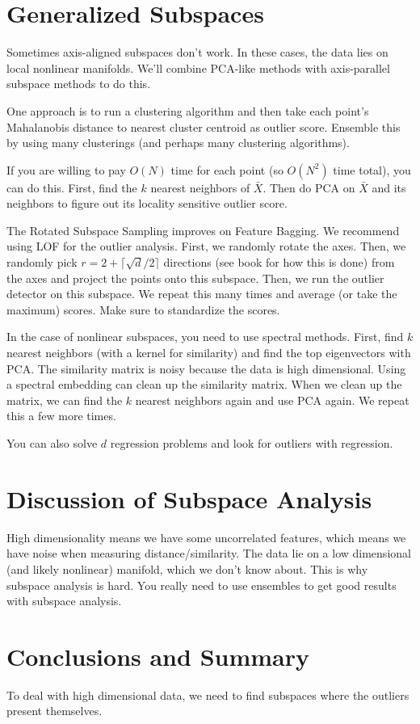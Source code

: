 \documentclass[a4paper]{article}
\begin{document}
\section{Generalized Subspaces}
Sometimes axis-aligned subspaces don't work. In these cases, the data lies on
local nonlinear manifolds. We'll combine PCA-like methods with axis-parallel
subspace methods to do this.

One approach is to run a clustering algorithm and then take each point's
Mahalanobis distance to nearest cluster centroid as outlier score. Ensemble this
by using many clusterings (and perhaps many clustering algorithms).

If you are willing to pay $O(N)$ time for each point (so $O(N^2)$ time total),
you can do this. First, find the $k$ nearest neighbors of $\bar{X}$. Then
do PCA on $\bar{X}$ and its neighbors to figure out its locality sensitive
outlier score.

The Rotated Subspace Sampling improves on Feature Bagging. We recommend using
LOF for the outlier analysis. First, we randomly rotate the axes. Then, we
randomly pick $r = 2 + \lceil \sqrt{d} / 2 \rceil$ directions (see book for
how this is done) from the axes and project the points onto this subspace.
Then, we run the outlier detector on this subspace. We repeat this many times
and average (or take the maximum) scores. Make sure to standardize the scores.

In the case of nonlinear subspaces, you need to use spectral methods. First,
find $k$ nearest neighbors (with a kernel for similarity) and find the top
eigenvectors with PCA. The similarity matrix is noisy because the data is
high dimensional. Using a spectral embedding can clean up the similarity matrix.
When we clean up the matrix, we can find the $k$ nearest neighbors again and
use PCA again. We repeat this a few more times.

You can also solve $d$ regression problems and look for outliers with
regression.

\section{Discussion of Subspace Analysis}
High dimensionality means we have some uncorrelated features, which means
we have noise when measuring distance/similarity. The data lie on a low
dimensional (and likely nonlinear) manifold, which we don't know about.
This is why subspace analysis is hard. You really need to use ensembles to get
good results with subspace analysis.

\section{Conclusions and Summary}
To deal with high dimensional data, we need to find subspaces where the outliers
present themselves.
\end{document}
